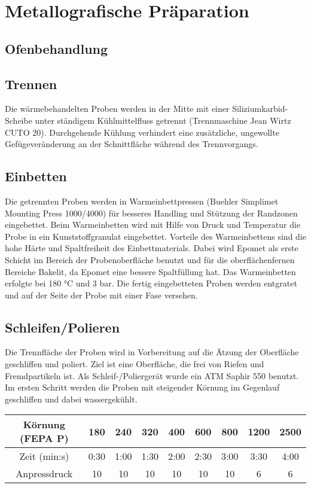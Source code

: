 

\section {Metallografische Präparation}

\subsection{Ofenbehandlung }

\subsection{Trennen}
Die wärmebehandelten Proben werden in der Mitte mit einer Siliziumkarbid-Scheibe unter ständigem Kühlmittelfluss getrennt (Trennmaschine Jean Wirtz CUTO 20). Durchgehende Kühlung  verhindert eine zusätzliche, ungewollte Gefügeveränderung an der Schnittfläche während des Trennvorgangs.

 
\subsection{Einbetten}
Die getrennten Proben werden in Warmeinbettpressen (Buehler Simplimet Mounting Press 1000/4000) für besseres Handling und Stützung der Randzonen eingebettet. Beim Warmeinbetten wird mit Hilfe von Druck und Temperatur die Probe in ein Kunststoffgranulat eingebettet. Vorteile des Warmeinbettens sind die hohe Härte und Spaltfreiheit des Einbettmaterials. Dabei wird Epomet als erste Schicht im Bereich der Probenoberfläche benutzt und für die oberflächenfernen Bereiche Bakelit, da Epomet eine bessere Spaltfüllung hat. Das Warmeinbetten erfolgte bei 180 °C und 3 bar. 
Die fertig eingebetteten Proben werden entgratet und auf der Seite der Probe mit einer Fase versehen.  


\subsection{Schleifen/Polieren}
 
Die Trennfläche der Proben wird in Vorbereitung auf die Ätzung der Oberfläche geschliffen und poliert. Ziel ist eine Oberfläche, die frei von Riefen und Fremdpartikeln ist. Als Schleif-/Poliergerät wurde ein ATM Saphir 550 benutzt.
Im ersten Schritt werden die Proben mit steigender Körnung im Gegenlauf geschliffen und dabei wassergekühlt. 


\begin{tabular}{|c|c|c|c|c|c|c|c|c|}
	\hline 
	Körnung (FEPA P) & 180 & 240 & 320 & 400 & 600 & 800 & 1200 & 2500 \\ 
	\hline 
	Zeit (min:s) & 0:30 & 1:00 & 1:30 & 2:00 & 2:30 & 3:00 & 3:30 & 4:00 \\ 
	\hline 
	Anpressdruck & 10&10&10&10&10&10&6&6\\
	\hline
\end{tabular} 


